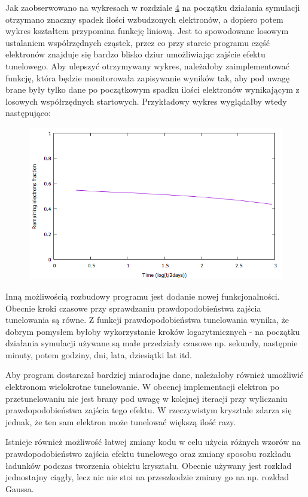 Jak zaobserwowano na wykresach w rozdziale \hyperref[wynik:wykres]{4} na początku działania symulacji otrzymano znaczny spadek ilości wzbudzonych elektronów, a dopiero potem wykres kształtem przypomina funkcję liniową. Jest to spowodowane losowym ustalaniem współrzędnych cząstek, przez co przy starcie programu część elektronów znajduje się bardzo blisko dziur umożliwiając zajście efektu tunelowego. Aby ulepszyć otrzymywany wykres, należałoby zaimplementować funkcję, która będzie monitorowała zapisywanie wyników tak, aby pod uwagę brane były tylko dane po początkowym spadku ilości elektronów wynikającym z losowych współrzędnych startowych. Przykładowy wykres wyglądałby wtedy następująco:
\begin{figure}[h]
\centering
\includegraphics[width=17cm]{przyklad_ulepszony}
\end{figure}

Inną możliwością rozbudowy programu jest dodanie nowej funkcjonalności. Obecnie kroki czasowe przy sprawdzaniu prawdopodobieństwa zajścia tunelowania są równe. Z funkcji prawdopodobieństwa tunelowania wynika, że dobrym pomysłem byłoby wykorzystanie kroków logarytmicznych - na początku działania symulacji używane są małe przedziały czasowe np. sekundy, następnie minuty, potem godziny, dni, lata, dziesiątki lat itd.

Aby program dostarczał bardziej miarodajne dane, należałoby również umożliwić elektronom wielokrotne tunelowanie. W obecnej implementacji elektron po przetunelowaniu nie jest brany pod uwagę w kolejnej iteracji przy wyliczaniu prawdopodobieństwa zajścia tego efektu. W rzeczywistym krysztale zdarza się jednak, że ten sam elektron może tunelować większą ilość razy.

Istnieje również możliwość łatwej zmiany kodu w celu użycia różnych wzorów na prawdopodobieństwo zajścia efektu tunelowego oraz zmiany sposobu rozkładu ładunków podczas tworzenia obiektu kryształu. Obecnie używany jest rozkład jednostajny ciągły, lecz nic nie stoi na przeszkodzie zmiany go na np. rozkład Gaussa. 